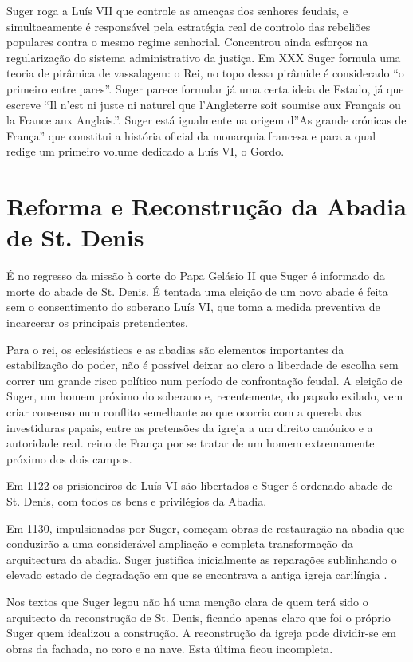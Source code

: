 \documentclass{article}
\begin{document}
Suger roga a Luís VII que controle as ameaças dos senhores feudais, e
simultaeamente é responsável pela estratégia real de controlo das
rebeliões populares contra o mesmo regime senhorial. Concentrou ainda
esforços na regularização do sistema administrativo da justiça. Em XXX
Suger formula uma teoria de pirâmica de vassalagem: o Rei, no topo
dessa pirâmide é considerado ``o primeiro entre pares''. Suger parece
formular já uma certa ideia de Estado, já que escreve ``Il n’est ni
juste ni naturel que l’Angleterre soit soumise aux Français ou la
France aux Anglais.''. Suger está igualmente na origem d''As grande
crónicas de França'' que constitui a história oficial da monarquia
francesa e para a qual redige um primeiro volume dedicado a Luís VI, o
Gordo.

\section{Reforma e Reconstrução da Abadia de St. Denis}

É no regresso da missão à corte do Papa Gelásio II que Suger é
informado da morte do abade de St. Denis. É tentada uma eleição de um
novo abade é feita sem o consentimento do soberano Luís VI, que toma a
medida preventiva de incarcerar os principais pretendentes.

Para o rei, os eclesiásticos e as abadias são elementos importantes da
estabilização do poder, não é possível deixar ao clero a liberdade de
escolha sem correr um grande risco político num período de
confrontação feudal. A eleição de Suger, um homem próximo do soberano
e, recentemente, do papado exilado, vem criar consenso num conflito
semelhante ao que ocorria com a querela das investiduras papais, entre
as pretensões da igreja a um direito canónico e a autoridade real.
reino de França por se tratar de um homem extremamente próximo dos
dois campos.

Em 1122 os prisioneiros de Luís VI são libertados e Suger é ordenado
abade de St. Denis, com todos os bens e privilégios da Abadia.

Em 1130, impulsionadas por Suger, começam obras de restauração na
abadia que conduzirão a uma considerável ampliação e completa
transformação da arquitectura da abadia. Suger justifica inicialmente
as reparações sublinhando o elevado estado de degradação em que se
encontrava a antiga igreja carilíngia \cite{calado}.

Nos textos que Suger legou não há uma menção clara de quem terá sido o
arquitecto da reconstrução de St. Denis, ficando apenas claro que foi
o próprio Suger quem idealizou a construção.  A reconstrução da igreja
pode dividir-se em obras da fachada, no coro e na nave. Esta última
ficou incompleta.
\end{document}
